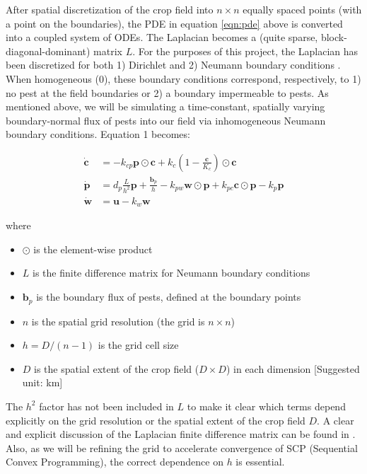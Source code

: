\documentclass[11pt]{article}
\begin{document}
After spatial discretization of the crop field into $n \times n$ equally spaced points (with a point on the boundaries), the PDE in equation \ref{eqn:pde} above is converted into a coupled system of ODEs. The Laplacian becomes a (quite sparse, block-diagonal-dominant) matrix $L$. For the purposes of this project, the Laplacian has been discretized for both 1) Dirichlet and 2) Neumann boundary conditions \cite{R5}. When homogeneous (0), these boundary conditions correspond, respectively, to 1) no pest at the field boundaries or 2) a boundary impermeable to pests. As mentioned above, we will be simulating a time-constant, spatially varying boundary-normal flux of pests into our field via inhomogeneous Neumann boundary conditions. Equation 1 becomes:

\begin{align}
\dot{\bm{c}} &= -k_{cp} \bm{p} \odot \bm{c} + k_c \left( 1 - \frac{\bm{c}}{K_c} \right) \odot \bm{c} \nonumber \\ 
\dot{\bm{p}} &= d_p \frac{L}{h^2} \bm{p} + \frac{\bm{b}_p}{h} - k_{pw} \bm{w} \odot \bm{p} + k_{pc} \bm{c} \odot \bm{p} - k_p \bm{p} \\
\dot{\bm{w}} &= \bm{u} - k_w \bm{w} \nonumber
\end{align}

where

\begin{itemize}
\setlength\itemsep{-1pt}
\item $\odot$ is the element-wise product
\item $L$ is the finite difference matrix for Neumann boundary conditions
\item $\bm{b}_p$ is the boundary flux of pests, defined at the boundary points
\item $n$ is the spatial grid resolution (the grid is $n \times n$)
\item $h = D / (n-1)$ is the grid cell size
\item $D$ is the spatial extent of the crop field ($D \times D$) in each dimension [Suggested unit: km]
\end{itemize}

The $h^2$ factor has not been included in $L$ to make it clear which terms depend explicitly on the grid resolution or the spatial extent of the crop field $D$. A clear and explicit discussion of the Laplacian finite difference matrix can be found in \cite{R5}. Also, as we will be refining the grid to accelerate convergence of SCP (Sequential Convex Programming), the correct dependence on $h$ is essential.
\end{document}
